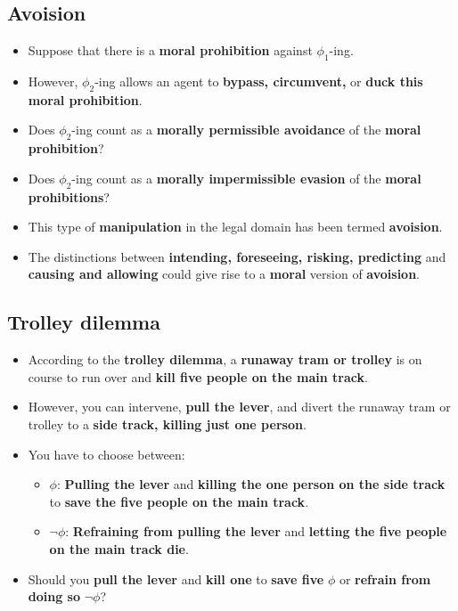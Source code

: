 \documentclass[11pt]{article}
\begin{document}
 \newpage
\subsection{Avoision}
\label{sec:org54389a5}
\begin{itemize}
\item Suppose that there is a \textbf{moral prohibition} against \(\phi_1\)-ing.
\item However, \(\phi_2\)-ing allows an agent to \textbf{bypass, circumvent,} or \textbf{duck this moral prohibition}.
\item Does \(\phi_2\)-ing count as a \textbf{morally permissible avoidance} of the \textbf{moral prohibition}?
\item Does \(\phi_2\)-ing count as a \textbf{morally impermissible evasion} of the \textbf{moral prohibitions}?
\item This type of \textbf{manipulation} in the legal domain has been termed \textbf{avoision}.
\item The distinctions between \textbf{intending, foreseeing, risking, predicting} and \textbf{causing and allowing} could give rise to a \textbf{moral} version of \textbf{avoision}.
\end{itemize}
\subsection{Trolley dilemma}
\label{sec:org8cc4db6}
\begin{itemize}
\item According to the \textbf{trolley dilemma}, a \textbf{runaway tram or trolley} is on course to run over and \textbf{kill five people on the main track}.
\item However, you can intervene, \textbf{pull the lever}, and divert the runaway tram or trolley to a \textbf{side track, killing just one person}.
\item You have to choose between:
\begin{itemize}
\item \(\phi\): \textbf{Pulling the lever} and \textbf{killing the one person on the side track} to \textbf{save the five people on the main track}.
\item \(\neg \phi\): \textbf{Refraining from pulling the lever} and \textbf{letting the five people on the main track die}.
\end{itemize}
\item Should you \textbf{pull the lever} and \textbf{kill one} to \textbf{save five} \(\phi\) or \textbf{refrain from doing so} \(\neg \phi\)?
\end{itemize}
\end{document}
